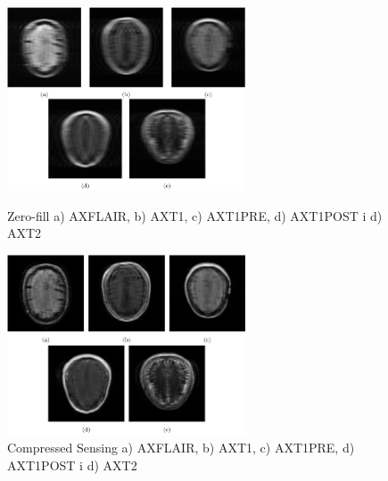 \documentclass[10pt,a4paper]{article}
\begin{document}
\begin{figure}[H]
\centering
\begin{minipage}{.45\textwidth}
  \centering
  \includegraphics[width=200pt]{./images/zero-fill.png}
  \caption{Zero-fill a) AXFLAIR, b) AXT1, c) AXT1PRE, d) AXT1POST i d) AXT2}
\end{minipage}%
\hspace{20pt} %
\begin{minipage}{.45\textwidth}
  \centering
  \includegraphics[width=200pt]{./images/compressed-sensing-images.png}
  \caption{Compressed Sensing a) AXFLAIR, b) AXT1, c) AXT1PRE, d) AXT1POST i d) AXT2}
\end{minipage}

\vspace{20pt} %


\end{figure}
\end{document}
